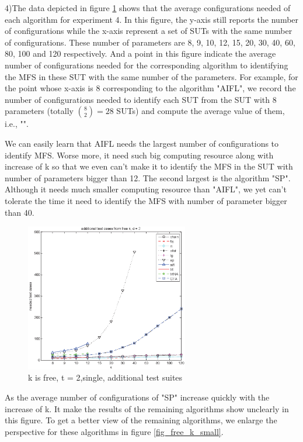 \documentclass[10pt,journal,cspaper,compsoc]{IEEEtran}
\begin{document}
4)The data depicted in figure \ref{fig_free_k} shows that the average configurations needed of each algorithm for experiment 4. In this figure, the y-axis still reports the number of configurations while the x-axis represent a set of SUTs with the same number of configurations. These number of parameters are 8, 9, 10, 12, 15, 20, 30, 40, 60, 80, 100 and 120 respectively. And a point in this figure indicate the average number of configurations needed for the corresponding algorithm to identifying the MFS in these SUT with the same number of the parameters. For example, for the point whose x-axis is 8 corresponding to the algorithm "AIFL", we record the number of configurations needed to identify each SUT from the SUT with 8 parameters (totally $\binom{8}{2} = 28$ SUTs) and compute the average value of them, i.e., "".

We can easily learn that AIFL needs the largest number of configurations to identify MFS. Worse more, it need such big computing resource along with increase of k so that we even can't make it to identify the MFS in the SUT with number of parameters bigger than 12.  The second largest is the algorithm "SP". Although it needs much smaller computing resource than "AIFL", we yet can't tolerate the time it need to identify the MFS with number of parameter bigger than 40.

\begin{figure}
 \centering
 \includegraphics[width=2.8in]{k-2-s.eps}
 \caption{k is free, t = 2,single, additional test suites}
 \label{fig_free_k}
\end{figure}

As the average number of configurations of "SP" increase quickly with the increase of k. It make the results of the remaining algorithms show unclearly in this figure. To get a better view of the remaining algorithms, we enlarge the  perspective for these algorithms in figure \ref{fig_free_k_small}.
\end{document}
